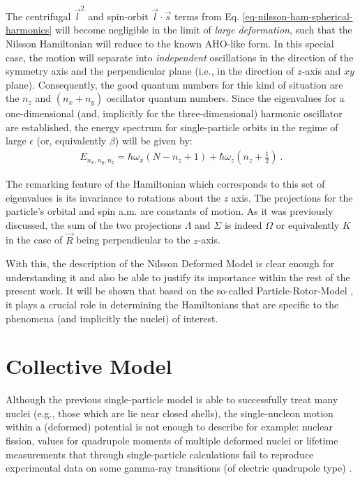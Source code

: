 The centrifugal $\vec{l}^2$ and spin-orbit $\vec{l}\cdot\vec{s}$ terms from Eq. \ref{eq-nilsson-ham-spherical-harmonics} will become negligible in the limit of \emph{large deformation}, such that the Nilsson Hamiltonian will reduce to the known AHO-like form. In this special case, the motion will separate into \emph{independent} oscillations in the direction of the symmetry axis and the perpendicular plane (i.e., in the direction of $z$-axis and $xy$ plane). Consequently, the good quantum numbers for this kind of situation are the $n_z$ and $(n_x+n_y)$ oscillator quantum numbers. Since the eigenvalues for a one-dimensional (and, implicitly for the three-dimensional) harmonic oscillator are established, the energy spectrum for single-particle orbits in the regime of large $\epsilon$ (or, equivalently $\beta$) will be given by:
\begin{align}
    E_{n_x,n_y,n_z}=\hbar\omega_x(N-n_z+1)+\hbar\omega_z\left(n_z+\frac{1}{2}\right)\ .
\end{align}

The remarking feature of the Hamiltonian which corresponds to this set of eigenvalues is its invariance to rotations about the $z$ axis. The projections for the particle's orbital and spin a.m. are constants of motion. As it was previously discussed, the sum of the two projections $\Lambda$ and $\Sigma$ is indeed $\Omega$ or equivalently $K$ in the case of $\vec{R}$ being perpendicular to the $z$-axis.

With this, the description of the Nilsson Deformed Model is clear enough for understanding it and also be able to justify its importance within the rest of the present work. It will be shown that based on the so-called Particle-Rotor-Model \cite{bohr1998nuclear,davydov1958rotational}, it plays a crucial role in determining the Hamiltonians that are specific to the phenomena (and implicitly the nuclei) of interest.

\section{Collective Model}

Although the previous single-particle model is able to successfully treat many nuclei (e.g., those which are lie near closed shells), the single-nucleon motion within a (deformed) potential is not enough to describe for example: nuclear fission, values for quadrupole moments of multiple deformed nuclei \cite{townes1949nuclear} or lifetime measurements that through single-particle calculations fail to reproduce experimental data on some gamma-ray transitions (of electric quadrupole type) \cite{goldhaber1951classification}.

